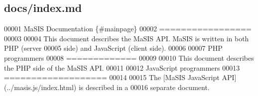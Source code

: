 \hypertarget{index_8md_source}{\subsection{docs/index.md}
}

\begin{DoxyCode}
00001 MaSIS Documentation       \{#mainpage\}
00002 =================
00003 
00004 This document describes the MaSIS API. MaSIS is written in both PHP (server
00005 side) and JavaScript (client side).
00006 
00007 PHP programmers
00008 =============
00009 
00010 This document describes the PHP side of the MaSIS API.
00011 
00012 JavaScript programmers
00013 ===================
00014 
00015 The [MaSIS JavaScript API](../masis.js/index.html) is described in a
00016 separate document.
\end{DoxyCode}
